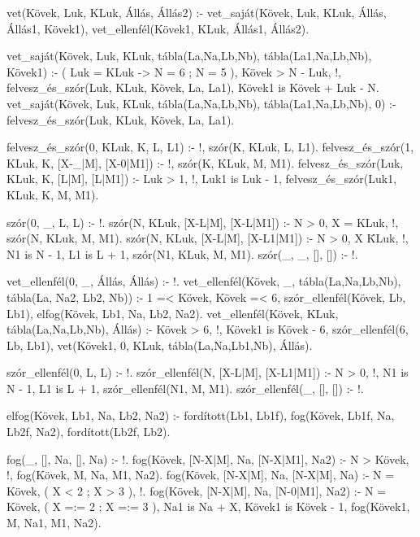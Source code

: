 \begin{program}
vet(Kövek, Luk, KLuk, Állás, Állás2) :-
    vet_saját(Kövek, Luk, KLuk, Állás,
              Állás1, Kövek1),
    vet_ellenfél(Kövek1, KLuk, Állás1, Állás2).

vet_saját(Kövek, Luk, KLuk, tábla(La,Na,Lb,Nb),
          tábla(La1,Na,Lb,Nb), Kövek1) :-
    ( Luk = KLuk -> N = 6 ; N = 5 ),
    Kövek > N - Luk, !,
    felvesz_és_szór(Luk, KLuk, Kövek, La, La1),
    Kövek1 is Kövek + Luk - N.
vet_saját(Kövek, Luk, KLuk, tábla(La,Na,Lb,Nb),
          tábla(La1,Na,Lb,Nb), 0) :-
    felvesz_és_szór(Luk, KLuk, Kövek, La, La1).

felvesz_és_szór(0, KLuk, K, L, L1) :-
    !, szór(K, KLuk, L, L1).
felvesz_és_szór(1, KLuk, K, [X-_|M], [X-0|M1]) :-
    !, szór(K, KLuk, M, M1).
felvesz_és_szór(Luk, KLuk, K, [L|M], [L|M1]) :-
    Luk > 1, !, Luk1 is Luk - 1,
    felvesz_és_szór(Luk1, KLuk, K, M, M1).

szór(0, _, L, L) :- !.
szór(N, KLuk, [X-L|M], [X-L|M1]) :-
    N > 0, X = KLuk, !,
    szór(N, KLuk, M, M1).
szór(N, KLuk, [X-L|M], [X-L1|M1]) :-
    N > 0, X \= KLuk, !,
    N1 is N - 1, L1 is L + 1,
    szór(N1, KLuk, M, M1).
szór(_, _, [], []) :- !.

vet_ellenfél(0, _, Állás, Állás) :- !.
vet_ellenfél(Kövek, _, tábla(La,Na,Lb,Nb),
             tábla(La, Na2, Lb2, Nb)) :-
    1 =< Kövek, Kövek =< 6,
    szór_ellenfél(Kövek, Lb, Lb1),
    elfog(Kövek, Lb1, Na, Lb2, Na2).
vet_ellenfél(Kövek, KLuk,
             tábla(La,Na,Lb,Nb), Állás) :-
    Kövek > 6, !, Kövek1 is Kövek - 6,
    szór_ellenfél(6, Lb, Lb1),
    vet(Kövek1, 0, KLuk, tábla(La,Na,Lb1,Nb), Állás).

szór_ellenfél(0, L, L) :- !.  
szór_ellenfél(N, [X-L|M], [X-L1|M1]) :-
    N > 0, !,
    N1 is N - 1, L1 is L + 1,
    szór_ellenfél(N1, M, M1).
szór_ellenfél(_, [], []) :- !.

elfog(Kövek, Lb1, Na, Lb2, Na2) :-
    fordított(Lb1, Lb1f),
    fog(Kövek, Lb1f, Na, Lb2f, Na2),
    fordított(Lb2f, Lb2).

fog(_, [], Na, [], Na) :- !.
fog(Kövek, [N-X|M], Na, [N-X|M1], Na2) :-
    N > Kövek, !, fog(Kövek, M, Na, M1, Na2).
fog(Kövek, [N-X|M], Na, [N-X|M], Na) :-
    N = Kövek, ( X < 2 ; X > 3 ), !.
fog(Kövek, [N-X|M], Na, [N-0|M1], Na2) :-
    N = Kövek, ( X =:= 2 ; X =:= 3 ),
    Na1 is Na + X, Kövek1 is Kövek - 1,
    fog(Kövek1, M, Na1, M1, Na2).
\end{program}

